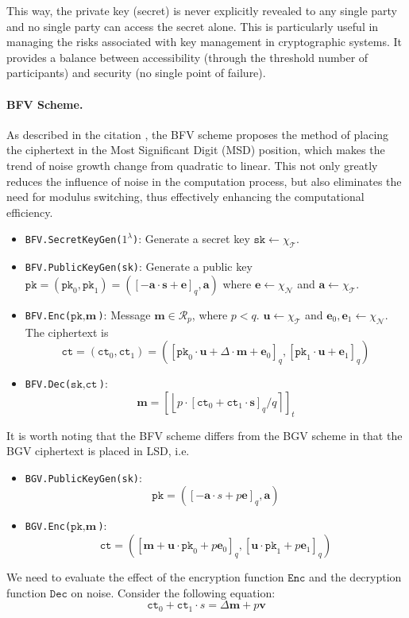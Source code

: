 \documentclass[11pt]{article}
\begin{document}
This way, the private key (secret) is never explicitly revealed to any single party and no single party can access the secret alone.
This is particularly useful in managing the risks associated with key management in cryptographic systems.
It provides a balance between accessibility (through the threshold number of participants) and security (no single point of failure).

\paragraph{BFV Scheme.}
As described in the citation \cite{10.1007/978-3-642-32009-5_50, cryptoeprint:2012/144}, the BFV scheme proposes the method of placing the ciphertext in the Most Significant Digit (MSD) position, which makes the trend of noise growth change from quadratic to linear. This not only greatly reduces the influence of noise in the computation process, but also eliminates the need for modulus switching, thus effectively enhancing the computational efficiency.

\begin{itemize}
\item \texttt{BFV.SecretKeyGen($1^\lambda$)}: Generate a secret key $\texttt{sk}\leftarrow \chi_\mathcal{T}$.
\item \texttt{BFV.PublicKeyGen(\texttt{sk})}: Generate a public key $\texttt{pk} =(\texttt{pk}_0,\texttt{pk}_1)= \left([-\mathbf{a}\cdot\mathbf{s}+\mathbf{e}]_{q}, \mathbf{a}\right)$ where $\mathbf{e}\leftarrow \chi_\mathcal{N}$ and $\mathbf{a}\leftarrow \chi_\mathcal{T}$.
\item \texttt{BFV.Enc($\texttt{pk},\textbf{m}$)}: Message $\mathbf{m}\in \mathcal{R}_p$, where $p<q$. $\mathbf{u}\leftarrow \chi_\mathcal{T}$ and $\mathbf{e}_0, \mathbf{e}_1\leftarrow \chi_\mathcal{N}$. The ciphertext is $$\texttt{ct} = (\texttt{ct}_0,\texttt{ct}_1)=\left([\texttt{pk}_0\cdot\mathbf{u}+\Delta\cdot\mathbf{m}+\mathbf{e}_0]_{q},[\texttt{pk}_1\cdot\mathbf{u}+\mathbf{e}_1]_{q}\right)$$
\item \texttt{BFV.Dec($\texttt{sk},\texttt{ct}$)}: $$\mathbf{m}=\left[\left\lfloor p\cdot[\texttt{ct}_0+\texttt{ct}_1\cdot\mathbf{s}]_q/q\right\rceil\right]_t$$
\end{itemize}
It is worth noting that the BFV scheme differs from the BGV scheme in that the BGV ciphertext is placed in LSD, i.e.
\begin{itemize}
\item \texttt{BGV.PublicKeyGen(\texttt{sk})}: $$\texttt{pk}=([-\mathbf{a}\cdot{s}+p\mathbf{e}]_q, \mathbf{a})$$
\item \texttt{BGV.Enc($\texttt{pk},\textbf{m}$)}: $$\texttt{ct}=([ \mathbf{m}+\mathbf{u}\cdot\texttt{pk}_0+p\mathbf{e}_0]_q,[\mathbf{u}\cdot\texttt{pk}_1+p\mathbf{e}_1]_q)$$
\end{itemize}
We need to evaluate the effect of the encryption function $\texttt{Enc}$ and the decryption function $\texttt{Dec}$ on noise. Consider the following equation:
\begin{equation}
\texttt{ct}_0+\texttt{ct}_1\cdot{s}=\Delta\mathbf{m}+p\mathbf{v}
\end{equation}
\end{document}
